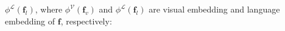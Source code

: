 \documentclass[runningheads]{llncs}
\begin{document}
$\phi^{\mathcal{L}}(\mathbf{f}_l)$, where  $\phi^{\mathcal{V}}(\mathbf{f}_v)$ and  $\phi^{\mathcal{L}}(\mathbf{f}_l)$ are  visual embedding and language embedding of $\mathbf{f}$, respectively:%
\end{document}
